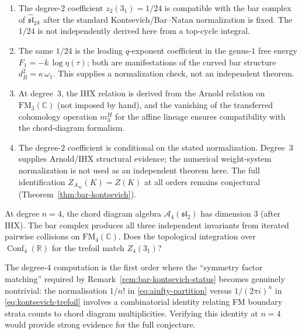 \documentclass[11pt]{article}
\newcommand{\cA}{\mathcal{A}}
\newcommand{\fsl}{\mathfrak{sl}}
\newcommand{\barB}{\overline{B}}
\newcommand{\C}{\mathbb{C}}
\newcommand{\R}{\mathbb{R}}
\newcommand{\FM}{\mathrm{FM}}
\DeclareMathOperator{\Conf}{Conf}
\begin{document}
\begin{enumerate}
\item The degree-$2$ coefficient $z_2(3_1)=1/24$ is compatible
  with the bar complex of $\widehat{\fsl}_2{}_k$ after the
  standard Kontsevich/Bar--Natan normalization is fixed.  The
  $1/24$ is not independently derived here from a top-cycle
  integral.

\item The same $1/24$ is the leading $q$-exponent coefficient in
  the genus-$1$ free energy $F_1=-k\,\log\eta(\tau)$; both are
  manifestations of the curved bar structure
  $d_{\barB}^2 = \kappa\,\omega_1$.
  This supplies a normalization check, not an independent theorem.

\item At degree~$3$, the IHX relation is derived from the
  Arnold relation on $\FM_3(\C)$ (not imposed by hand), and
  the vanishing of the transferred cohomology operation $m_3^H$
  for the affine lineage ensures compatibility with the
  chord-diagram formalism.

\item The degree-$2$ coefficient is conditional on the stated
  normalization.  Degree~$3$ supplies Arnold/IHX structural
  evidence; the numerical weight-system normalization is not used
  as an independent theorem here.  The full identification
  $Z_{A_\infty}(K)=Z(K)$ at all orders remains conjectural
  (Theorem~\ref{thm:bar-kontsevich}).
\end{enumerate}

\begin{question}
\label{q:degree-4-trefoil}
At degree $n = 4$, the chord diagram algebra $\cA_4(\fsl_2)$
has dimension $3$ (after IHX).  The bar complex produces
all three independent invariants from iterated pairwise
collisions on $\FM_4(\C)$.  Does the topological integration
over $\Conf_4(\R)$ for the trefoil match $Z_4(3_1)$?

The degree-$4$ computation is the first order where the
``symmetry factor matching'' required by
Remark~\ref{rem:bar-kontsevich-status} becomes genuinely
nontrivial: the normalisation $1/n!$ in
\eqref{eq:ainfty-partition} versus $1/(2\pi i)^n$ in
\eqref{eq:kontsevich-trefoil} involves a combinatorial
identity relating FM boundary strata counts to chord diagram
multiplicities.  Verifying this identity at $n = 4$ would
provide strong evidence for the full conjecture.
\end{question}


\end{document}
